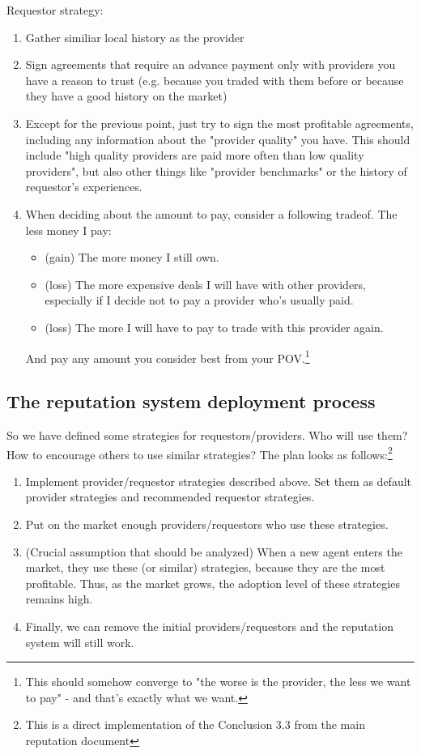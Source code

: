 \documentclass{article}
\begin{document}
Requestor strategy:
\begin{enumerate}
    \item Gather similiar local history as the provider
    \item Sign agreements that require an advance payment only with providers you have a reason to trust 
        (e.g. because you traded with them before or because they have a good history on the market)
    \item Except for the previous point, just try to sign the most profitable agreements, including any information about the "provider quality" you have.
        This should include "high quality providers are paid more often than low quality providers", but also other things like "provider benchmarks" or
        the history of requestor's experiences.
    \item When deciding about the amount to pay, consider a following tradeof. The less money I pay:
        \begin{itemize}
            \item (gain) The more money I still own.
            \item (loss) The more expensive deals I will have with other providers, especially if I decide not to pay a provider who's usually paid.
            \item (loss) The more I will have to pay to trade with this provider again.
        \end{itemize}
        And pay any amount you consider best from your POV.\footnote{
            This should somehow converge to "the worse is the provider, the less we want to pay" - and that's exactly what we want.
        }
\end{enumerate}

\subsection{The reputation system deployment process}

So we have defined some strategies for requestors/providers.
Who will use them? How to encourage others to use similar strategies?
The plan looks as follows:\footnote{This is a direct implementation of the Conclusion 3.3 from the main reputation document}
\begin{enumerate}
    \item Implement provider/requestor strategies described above. Set them as default provider strategies and recommended requestor strategies.
    \item Put on the market enough providers/requestors who use these strategies.
    \item (Crucial assumption that should be analyzed) When a new agent enters the market, they use these (or similar) strategies, because they
        are the most profitable. Thus, as the market grows, the adoption level of these strategies remains high.
    \item Finally, we can remove the initial providers/requestors and the reputation system will still work.
\end{enumerate}
\end{document}
